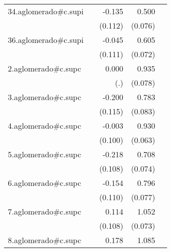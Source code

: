 {\begin{longtable}{l*{4}{D{.}{.}{-1}}}
\addlinespace
34.aglomerado#c.supi&                     &      -0.135         &       0.500\sym{***}&                     \\
            &                     &     (0.112)         &     (0.076)         &                     \\
\addlinespace
36.aglomerado#c.supi&                     &      -0.045         &       0.605\sym{***}&                     \\
            &                     &     (0.111)         &     (0.072)         &                     \\
\addlinespace
2.aglomerado#c.supc&                     &       0.000         &       0.935\sym{***}&                     \\
            &                     &         (.)         &     (0.078)         &                     \\
\addlinespace
3.aglomerado#c.supc&                     &      -0.200         &       0.783\sym{***}&                     \\
            &                     &     (0.115)         &     (0.083)         &                     \\
\addlinespace
4.aglomerado#c.supc&                     &      -0.003         &       0.930\sym{***}&                     \\
            &                     &     (0.100)         &     (0.063)         &                     \\
\addlinespace
5.aglomerado#c.supc&                     &      -0.218\sym{*}  &       0.708\sym{***}&                     \\
            &                     &     (0.108)         &     (0.074)         &                     \\
\addlinespace
6.aglomerado#c.supc&                     &      -0.154         &       0.796\sym{***}&                     \\
            &                     &     (0.110)         &     (0.077)         &                     \\
\addlinespace
7.aglomerado#c.supc&                     &       0.114         &       1.052\sym{***}&                     \\
            &                     &     (0.108)         &     (0.073)         &                     \\
\addlinespace
8.aglomerado#c.supc&                     &       0.178         &       1.085\sym{***}&                     \\

\end{longtable}}
